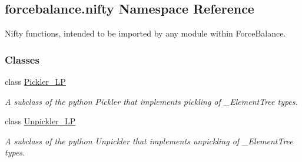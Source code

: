\hypertarget{namespaceforcebalance_1_1nifty}{\subsection{forcebalance.\-nifty Namespace Reference}
\label{namespaceforcebalance_1_1nifty}
}


Nifty functions, intended to be imported by any module within Force\-Balance.  


\subsubsection*{Classes}
\begin{DoxyCompactItemize}
\item 
class \hyperlink{classforcebalance_1_1nifty_1_1Pickler__LP}{Pickler\-\_\-\-L\-P}
\begin{DoxyCompactList}\small\item\em A subclass of the python Pickler that implements pickling of \-\_\-\-Element\-Tree types. \end{DoxyCompactList}\item 
class \hyperlink{classforcebalance_1_1nifty_1_1Unpickler__LP}{Unpickler\-\_\-\-L\-P}
\begin{DoxyCompactList}\small\item\em A subclass of the python Unpickler that implements unpickling of \-\_\-\-Element\-Tree types. \end{DoxyCompactList}\end{DoxyCompactItemize}
